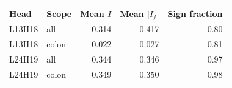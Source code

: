 \begin{tabular}{llrrr}
\toprule
Head & Scope & Mean $I$ & Mean $|I_f|$ & Sign fraction \\
\midrule
L13H18 & all & 0.314 & 0.417 & 0.80 \\
L13H18 & colon & 0.022 & 0.027 & 0.81 \\
L24H19 & all & 0.344 & 0.346 & 0.97 \\
L24H19 & colon & 0.349 & 0.350 & 0.98 \\
\bottomrule
\end{tabular}

